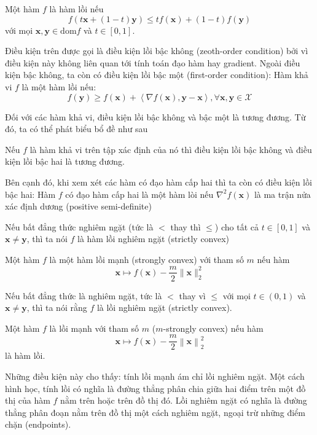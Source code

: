 Một hàm $f$ là hàm lồi nếu
\begin{equation}
    f(t\mathbf{x} + (1-t)\mathbf{y}) \leq tf(\mathbf{x}) + (1-t)f(\mathbf{y})
\end{equation}
với mọi $\mathbf{x}, \mathbf{y} \in \text{dom}f$ và $t \in [0, 1]$.

Điều kiện trên được gọi là điều kiện lồi bậc không (zeoth-order condition) bởi vì điều kiện này không liên quan tới tính toán đạo hàm hay gradient. Ngoài điều kiện bậc không, ta còn có điều kiện lồi bậc một (first-order condition): Hàm khả vi $f$ là một hàm lồi nếu:
\begin{equation}
    f(\mathbf{y}) \geq f(\mathbf{x}) + \left<\nabla f(\mathbf{x}), \mathbf{y}-\mathbf{x}\right>, \forall \mathbf{x}, \mathbf{y} \in \mathcal{X}
\end{equation}

Đối với các hàm khả vi, điều kiện lồi bậc không và bậc một là tương đương. Từ đó, ta có thể phát biểu bổ đề như sau
\begin{lemma}
    Nếu $f$ là hàm khả vi trên tập xác định của nó thì điều kiện lồi bậc không và điều kiện lồi bậc hai là tương đương.
\end{lemma}

Bên cạnh đó, khi xem xét các hàm có đạo hàm cấp hai thì ta còn có điều kiện lồi bậc hai: Hàm $f$ có đạo hàm cấp hai là một hàm lòi nếu $\nabla^2 f(\mathbf{x})$ là ma trận nửa xác định dương (positive semi-definite)

Nếu bất đẳng thức nghiêm ngặt (tức là $<$ thay thì $\leq$) cho tất cả $t \in [0, 1]$ và $\mathbf{x} \ne \mathbf{y}$, thì ta nói $f$ là hàm lồi nghiêm ngặt (strictly convex)

Một hàm $f$ là một hàm lồi mạnh (strongly convex) với tham số $m$ nếu hàm
\begin{equation}
    \mathbf{x} \mapsto f(\mathbf{x}) - \frac{m}{2}\|\mathbf{x}\|_2^2
\end{equation}

Nếu bất đẳng thức là nghiêm ngặt, tức là $<$ thay vì $\leq$ với mọi $t \in (0, 1)$ và $\mathbf{x} \ne \mathbf{y}$, thì ta nói rằng $f$ là lồi nghiêm ngặt (strictly convex).

Một hàm $f$ là lồi mạnh với tham số $m$ ($m$-strongly convex) nếu hàm
\begin{equation}
    \mathbf{x} \mapsto f(\mathbf{x}) - \frac{m}{2}\left\|\mathbf{x} \right\|_2^2
\end{equation}
là hàm lồi.

Những điều kiện này cho thấy: tính lồi mạnh ám chỉ lồi nghiêm ngặt. Một cách hình học, tính lồi có nghĩa là đường thẳng phân chia giữa hai điểm trên một đồ thị của hàm $f$ nằm trên hoặc trên đồ thị đó. Lồi nghiêm ngặt có nghĩa là đường thẳng phân đoạn nằm trên đồ thị một cách nghiêm ngặt, ngoại trừ những điểm chặn (endpoints).

